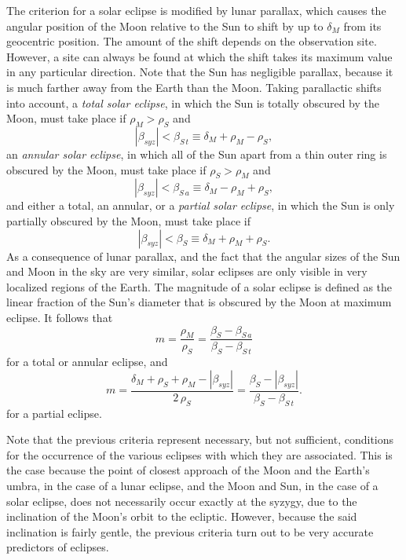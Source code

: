  The criterion for a solar eclipse is modified by lunar parallax, which causes the angular position of the Moon relative to the Sun to shift by up to $\delta_M$ from its geocentric position. The amount of the shift
 depends on the observation site. However, a site can always be found
 at which the shift takes its maximum value in any particular direction.
 Note that the Sun has negligible parallax, because it is much farther away from the Earth than the Moon. Taking parallactic shifts into account, a {\em total solar eclipse}, in which the Sun is totally obscured by the Moon,
must take place if $\rho_M>\rho_S$ and
 \begin{equation}\label{est}
 |\beta_{syz}| < \beta_{S\,t}\equiv \delta_M + \rho_M - \rho_S,
 \end{equation}
 an {\em annular solar eclipse}, in which all of the Sun apart from
 a thin outer ring is obscured by the Moon, must take place if
 $\rho_S>\rho_M$ and
 \begin{equation}
 |\beta_{syz}| <\beta_{S\,a}\equiv \delta_M - \rho_M+\rho_S,
 \end{equation}
 and either a total, an annular,  or a {\em partial solar eclipse}, in which the
 Sun is only partially obscured by the Moon,  must take place if
 \begin{equation}\label{esp}
    |\beta_{syz}|<\beta_S\equiv  \delta_M + \rho_M + \rho_S.
  \end{equation}
As a consequence of lunar parallax, and the fact that the angular sizes of the Sun and Moon in the sky are very similar, solar eclipses are only visible in very localized regions of the Earth. 
The magnitude of a solar eclipse is defined as the linear fraction of the Sun's diameter that is obscured by the Moon at maximum eclipse. It follows that
\begin{equation}
m = \frac{\rho_M}{\rho_S} = \frac{\beta_S-\beta_{S\,a}}{\beta_S-\beta_{S\,t}}
\end{equation}
for a total or annular eclipse, and 
\begin{equation}
m= \frac{\delta_M+\rho_S+\rho_M-|\beta_{syz}|}{2\,\rho_S} = \frac{\beta_S -|\beta_{syz}|}{\beta_S-\beta_{S\,t}}.
\end{equation}
for a partial eclipse. 

Note  that the previous criteria represent
necessary, but not sufficient, conditions for the occurrence of the various eclipses with which
they are associated. This is the case because the point of closest
approach of the Moon and the Earth's umbra, in the case of a
lunar eclipse, and the Moon and Sun, in the case of a solar eclipse, does
not necessarily occur exactly at the syzygy, due to the inclination
of the Moon's orbit to the ecliptic. However, because the said inclination
is fairly gentle, the previous criteria turn out to be very accurate
predictors of eclipses. 

